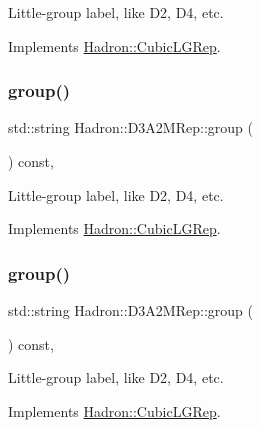 Little-\/group label, like D2, D4, etc. 

Implements \mbox{\hyperlink{structHadron_1_1CubicLGRep_a9bdb14b519a611d21379ed96a3a9eb41}{Hadron\+::\+Cubic\+L\+G\+Rep}}.

\mbox{\label{structHadron_1_1D3A2MRep_a8f43a2bae307e4f79549d0ca2e15e90d}} 
\subsubsection{\texorpdfstring{group()}{group()}\hspace{0.1cm}{\footnotesize\ttfamily [2/3]}}
{\footnotesize\ttfamily std\+::string Hadron\+::\+D3\+A2\+M\+Rep\+::group (\begin{DoxyParamCaption}{ }\end{DoxyParamCaption}) const\hspace{0.3cm}{\ttfamily [inline]}, {\ttfamily [virtual]}}

Little-\/group label, like D2, D4, etc. 

Implements \mbox{\hyperlink{structHadron_1_1CubicLGRep_a9bdb14b519a611d21379ed96a3a9eb41}{Hadron\+::\+Cubic\+L\+G\+Rep}}.

\mbox{\label{structHadron_1_1D3A2MRep_a8f43a2bae307e4f79549d0ca2e15e90d}} 
\subsubsection{\texorpdfstring{group()}{group()}\hspace{0.1cm}{\footnotesize\ttfamily [3/3]}}
{\footnotesize\ttfamily std\+::string Hadron\+::\+D3\+A2\+M\+Rep\+::group (\begin{DoxyParamCaption}{ }\end{DoxyParamCaption}) const\hspace{0.3cm}{\ttfamily [inline]}, {\ttfamily [virtual]}}

Little-\/group label, like D2, D4, etc. 

Implements \mbox{\hyperlink{structHadron_1_1CubicLGRep_a9bdb14b519a611d21379ed96a3a9eb41}{Hadron\+::\+Cubic\+L\+G\+Rep}}.

\mbox{\label{structHadron_1_1D3A2MRep_a64bf3c3f5c0fa0e49aa2f74421308ac3}} 
